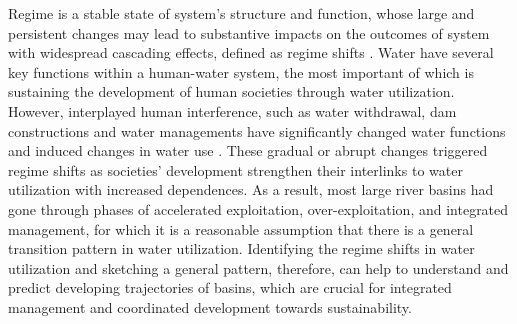 \documentclass[9pt, twocolumn, twoside, lineno]{pnas-new}
\begin{document}
Regime is a stable state of system’s structure and function, whose large and persistent changes may lead to substantive impacts on the outcomes of system with widespread cascading effects, defined as regime shifts \cite{rochaCascadingRegimeShifts2018,schefferCatastrophicRegimeShifts2003, schefferCatastrophicShiftsEcosystems2001}.
Water have several key functions within a human-water system, the most important of which is sustaining the development of human societies through water utilization. 
However, interplayed human interference, such as water withdrawal, dam constructions and water managements have significantly changed water functions and induced changes in water use
\cite{falkenmarkUnderstandingWaterResilience2019}.
These gradual or abrupt changes triggered regime shifts as societies' development strengthen their interlinks to water utilization with increased dependences.
As a result, most large river basins had gone through phases of accelerated exploitation, over-exploitation, and integrated management, for which it is a reasonable assumption that there is a general transition pattern in water utilization. 
Identifying the regime shifts in water utilization and sketching a general pattern, therefore, can help to understand and predict developing trajectories of basins, which are crucial for integrated management and coordinated development towards sustainability.

\end{document}
